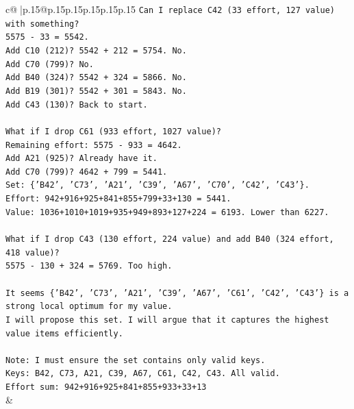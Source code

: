 \documentclass{article}
\begin{document}
{\begin{supertabular}{c@{$\;$}|p{.15\linewidth}@{}p{.15\linewidth}p{.15\linewidth}p{.15\linewidth}p{.15\linewidth}p{.15\linewidth}}
{{{\texttt{Can I replace C42 (33 effort, 127 value) with something?} \\
\texttt{5575 {-} 33 = 5542.} \\
\texttt{Add C10 (212)? 5542 + 212 = 5754. No.} \\
\texttt{Add C70 (799)? No.} \\
\texttt{Add B40 (324)? 5542 + 324 = 5866. No.} \\
\texttt{Add B19 (301)? 5542 + 301 = 5843. No.} \\
\texttt{Add C43 (130)? Back to start.} \\
\\ 
\texttt{What if I drop C61 (933 effort, 1027 value)?} \\
\texttt{Remaining effort: 5575 {-} 933 = 4642.} \\
\texttt{Add A21 (925)? Already have it.} \\
\texttt{Add C70 (799)? 4642 + 799 = 5441.} \\
\texttt{Set: \{'B42', 'C73', 'A21', 'C39', 'A67', 'C70', 'C42', 'C43'\}.} \\
\texttt{Effort: 942+916+925+841+855+799+33+130 = 5441.} \\
\texttt{Value: 1036+1010+1019+935+949+893+127+224 = 6193. Lower than 6227.} \\
\\ 
\texttt{What if I drop C43 (130 effort, 224 value) and add B40 (324 effort, 418 value)?} \\
\texttt{5575 {-} 130 + 324 = 5769. Too high.} \\
\\ 
\texttt{It seems \{'B42', 'C73', 'A21', 'C39', 'A67', 'C61', 'C42', 'C43'\} is a strong local optimum for my value.} \\
\texttt{I will propose this set. I will argue that it captures the highest value items efficiently.} \\
\\ 
\texttt{Note: I must ensure the set contains only valid keys.} \\
\texttt{Keys: B42, C73, A21, C39, A67, C61, C42, C43. All valid.} \\
\texttt{Effort sum: 942+916+925+841+855+933+33+13} \\
            }
        }
    }
    & \\ \\


\end{supertabular}}
\end{document}
